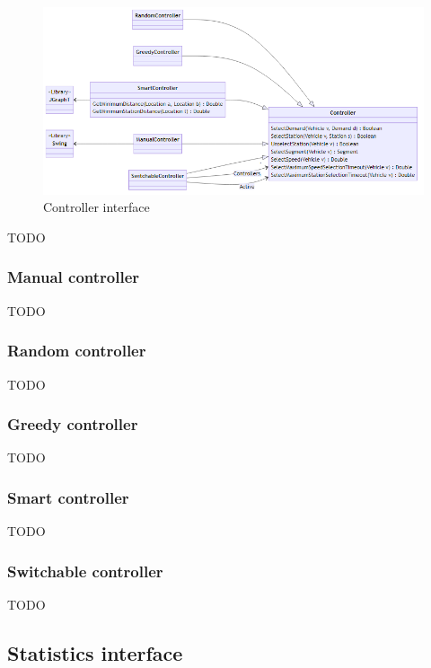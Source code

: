 \documentclass[10pt,twocolumn]{article}
\begin{document}
\begin{figure}[tbp]
    \includegraphics[width=\textwidth]{../../diagrams/controller/classes.png}
    \caption{Controller interface}
    \label{fig:controller-interface}
\end{figure}

TODO

\subsubsection{Manual controller}

TODO

\subsubsection{Random controller}

TODO

\subsubsection{Greedy controller}

TODO

\subsubsection{Smart controller}

TODO

\subsubsection{Switchable controller}

TODO

\subsection{Statistics interface}
\label{sec:statistics-interface}
\end{document}

